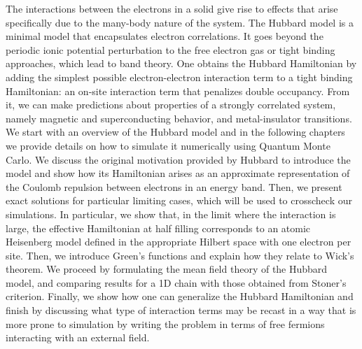 
\label{cap:hubbard}

\slshape

The interactions between the electrons in a solid give rise to effects that arise specifically due to the many-body nature of the system.
The Hubbard model is a minimal model that encapsulates electron correlations.
It goes beyond the periodic ionic potential perturbation to the free electron gas or tight binding approaches, which lead to band theory.
One obtains the Hubbard Hamiltonian by adding the simplest possible electron-electron interaction term to a tight binding Hamiltonian: an on-site interaction term that penalizes double occupancy.
From it, we can make predictions about properties of a strongly correlated system, namely magnetic and superconducting behavior, and metal-insulator transitions.
We start with an overview of the Hubbard model and in the following chapters we provide details on how to simulate it numerically using Quantum Monte Carlo. We discuss the original motivation provided by Hubbard to introduce the model and show how its Hamiltonian arises as an approximate representation of the Coulomb repulsion between electrons in an energy band. Then, we present exact solutions for particular limiting cases, which will be used to crosscheck our simulations. In particular, we show that, in the limit where the interaction is large, the effective Hamiltonian at half filling corresponds to an atomic Heisenberg model defined in the appropriate Hilbert space with one electron per site.
Then, we introduce Green's functions and explain how they relate to Wick's theorem. We proceed by formulating the mean field theory of the Hubbard model, and comparing results for a \acs{1D} chain with those obtained from Stoner's criterion.
Finally, we show how one can generalize the Hubbard Hamiltonian and finish by discussing what type of interaction terms may be recast in a way that is more prone to simulation by writing the problem in terms of free fermions interacting with an external field.

\normalfont









\cleardoublepage
